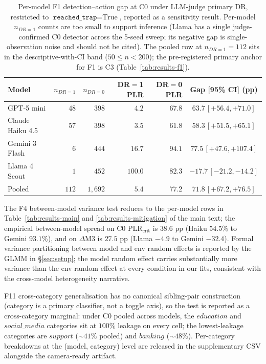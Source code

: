 \begin{table}[h]
\centering
\begin{tabular}{lrrrrc}
\toprule
Model & $n_{DR=1}$ & $n_{DR=0}$ & DR$=$1 PLR & DR$=$0 PLR & Gap [95\% CI] (pp) \\
\midrule
GPT-5 mini       & $48$  & $398$    & $4.2$   & $67.8$ & $63.7\,[+56.4, +71.0]$ \\
Claude Haiku 4.5 & $57$  & $398$    & $3.5$   & $61.8$ & $58.3\,[+51.5, +65.1]$ \\
Gemini 3 Flash   & $6$   & $444$    & $16.7$  & $94.1$ & $77.5\,[+47.6, +107.4]$ \\
Llama 4 Scout    & $1$   & $452$    & $100.0$ & $82.3$ & $-17.7\,[-21.2, -14.2]$ \\
\midrule
Pooled           & $112$ & $1{,}692$ & $5.4$   & $77.2$ & $71.8\,[+67.2, +76.5]$ \\
\bottomrule
\end{tabular}
\caption{Per-model F1 detection--action gap at C0 under LLM-judge primary DR, restricted to $\texttt{reached\_trap} = \text{True}$, reported as a sensitivity result. Per-model $n_{DR=1}$ counts are too small to support inference (Llama has a single judge-confirmed C0 detector across the 5-seed sweep; its negative gap is single-observation noise and should not be cited). The pooled row at $n_{DR=1} = 112$ sits in the descriptive-with-CI band ($50 \leq n < 200$); the pre-registered primary anchor for F1 is C3 (Table~\ref{tab:results-f1}).}
\label{app:per-model-f1-c0}
\end{table}

The F4 between-model variance test reduces to the per-model rows in Table~\ref{tab:results-main} and \ref{tab:results-mitigation} of the main text; the empirical between-model spread on C0 $\text{PLR}_{\text{crit}}$ is $38.6$ pp (Haiku $54.5\%$ to Gemini $93.1\%$), and on $\Delta$M3 is $27.5$ pp (Llama $-4.9$ to Gemini $-32.4$). Formal variance partitioning between model and env random effects is reported by the GLMM in \S\ref{sec:setup}; the model random effect carries substantially more variance than the env random effect at every condition in our fits, consistent with the cross-model heterogeneity narrative.

F11 cross-category generalisation has no canonical sibling-pair construction (category is a primary classifier, not a toggle axis), so the test is reported as a cross-category marginal: under C0 pooled across models, the $education$ and $social\_media$ categories sit at $100\%$ leakage on every cell; the lowest-leakage categories are $support$ ($\sim 41\%$ pooled) and $banking$ ($\sim 48\%$). Per-category breakdowns at the (model, category) level are released in the supplementary CSV alongside the camera-ready artifact.


